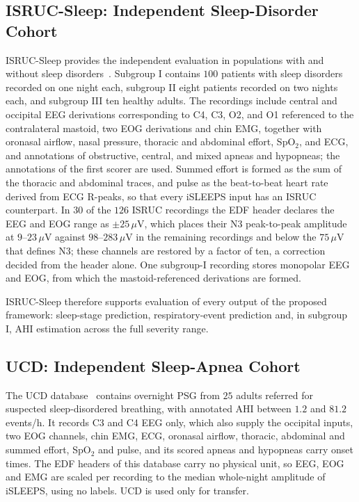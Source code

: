 \documentclass[a4paper,fleqn]{cas-sc}
\begin{document}
\subsection{ISRUC-Sleep: Independent Sleep-Disorder Cohort}

ISRUC-Sleep provides the independent evaluation in populations with and without
sleep disorders~\cite{khalighi2016isruc}. Subgroup I contains $100$ patients with
sleep disorders recorded on one night each, subgroup II eight patients recorded
on two nights each, and subgroup III ten healthy adults. The recordings include
central and occipital EEG derivations corresponding to C4, C3, O2, and O1
referenced to the contralateral mastoid, two EOG derivations and chin EMG,
together with oronasal airflow, nasal pressure, thoracic and abdominal effort,
SpO$_2$, and ECG, and annotations of obstructive, central, and mixed apneas and
hypopneas; the annotations of the first scorer are used. Summed effort is formed
as the sum of the thoracic and abdominal traces, and pulse as the beat-to-beat
heart rate derived from ECG R-peaks, so that every iSLEEPS input has an ISRUC
counterpart. In $30$ of the $126$ ISRUC recordings the EDF header declares the
EEG and EOG range as $\pm25\,\mu$V, which places their N3 peak-to-peak amplitude
at $9$--$23\,\mu$V against $98$--$283\,\mu$V in the remaining recordings and below
the $75\,\mu$V that defines N3; these channels are restored by a factor of ten, a
correction decided from the header alone. One subgroup-I recording stores
monopolar EEG and EOG, from which the mastoid-referenced derivations are formed.

ISRUC-Sleep therefore supports evaluation of every output of the proposed
framework: sleep-stage prediction, respiratory-event prediction and, in subgroup I,
AHI estimation across the full severity range.

\subsection{UCD: Independent Sleep-Apnea Cohort}

The UCD database~\cite{ucddb2007,goldberger2000physionet} contains overnight PSG
from $25$ adults referred for suspected sleep-disordered breathing, with annotated
AHI between $1.2$ and $81.2$ events/h. It records C3 and C4 EEG only, which also
supply the occipital inputs, two EOG channels, chin EMG, ECG, oronasal airflow,
thoracic, abdominal and summed effort, SpO$_2$ and pulse, and its scored apneas
and hypopneas carry onset times. The EDF headers of this database carry no physical
unit, so EEG, EOG and EMG are scaled per recording to the median whole-night
amplitude of iSLEEPS, using no labels. UCD is used only for transfer.
\end{document}

